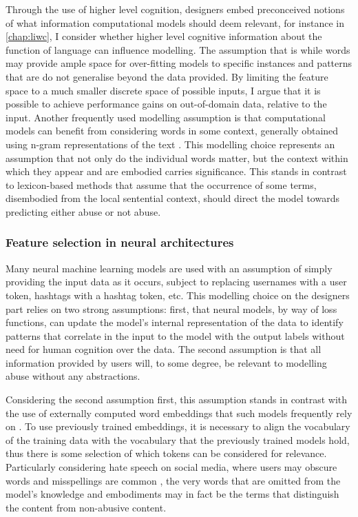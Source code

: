 Through the use of higher level cognition, designers embed preconceived notions of what information computational models should deem relevant, for instance in \autoref{chap:liwc}, I consider whether higher level cognitive information about the function of language can influence modelling. The assumption that is while words may provide ample space for over-fitting models to specific instances and patterns that are do not generalise beyond the data provided. By limiting the feature space to a much smaller discrete space of possible inputs, I argue that it is possible to achieve performance gains on out-of-domain data, relative to the input.
Another frequently used modelling assumption is that computational models can benefit from considering words in some context, generally obtained using n-gram representations of the text \citep{Waseem-Hovy:2016,Davidson:2017,Chiril:2019}. This modelling choice represents an assumption that not only do the individual words matter, but the context within which they appear and are embodied carries significance. This stands in contrast to lexicon-based methods \citep{Hurtlex:2019} that assume that the occurrence of some terms, disembodied from the local sentential context, should direct the model towards predicting either abuse or not abuse.

\subsubsection{Feature selection in neural architectures}

Many neural machine learning models are used with an assumption of simply providing the input data as it occurs, subject to replacing usernames with a user token, hashtags with a hashtag token, etc. This modelling choice on the designers part relies on two strong assumptions: first, that neural models, by way of loss functions, can update the model's internal representation of the data to identify patterns that correlate in the input to the model with the output labels without need for human cognition over the data. The second assumption is that all information provided by users will, to some degree, be relevant to modelling abuse without any abstractions.

Considering the second assumption first, this assumption stands in contrast with the use of externally computed word embeddings that such models frequently rely on \citep{Kshirsagar:2018,Isaksen:2020}. To use previously trained embeddings, it is necessary to align the vocabulary of the training data with the vocabulary that the previously trained models hold, thus there is some selection of which tokens can be considered for relevance. Particularly considering hate speech on social media, where users may obscure words and misspellings are common \citep{Rottger:2021}, the very words that are omitted from the model's knowledge and embodiments may in fact be the terms that distinguish the content from non-abusive content.

